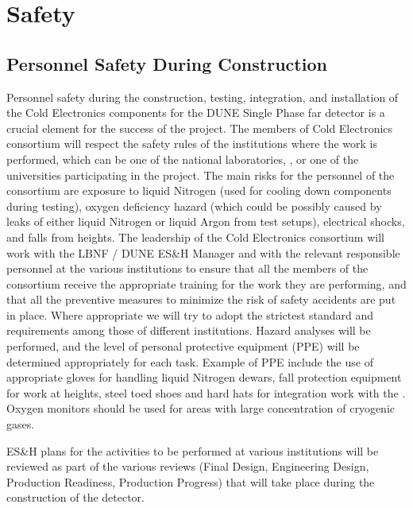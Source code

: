 \section{Safety}
\label{sec:fdsp-tpcelec-safety}

\subsection{Personnel Safety During Construction}
\label{sec:fdsp-tpcelec-safety-personnel}

Personnel safety during the construction, testing, integration,
and installation of the Cold Electronics components for the DUNE
Single Phase far detector is a crucial element for the success
of the project. The members of Cold Electronics consortium will
respect the safety rules of the institutions where the work is
performed, which can be one of the national laboratories, \surf,
or one of the universities participating in the project.  The
main risks for the personnel of the consortium are exposure to
liquid Nitrogen (used for cooling down components during testing),
oxygen deficiency hazard (which could be possibly caused by leaks
of either liquid Nitrogen or liquid Argon from test setups),
electrical shocks, and falls from heights. The leadership of the
Cold Electronics consortium will work with the LBNF / DUNE
ES\&H Manager and with the relevant responsible personnel at the
various institutions to ensure that all the members of the
consortium receive the appropriate training for the work they
are performing, and that all the preventive measures to minimize
the risk of safety accidents are put in place. Where appropriate
we will try to adopt the strictest standard and requirements among
those of different institutions. Hazard analyses will be performed,
and the level of personal protective equipment (PPE) will be determined
appropriately for each task. Example of PPE include the use of
appropriate gloves for handling liquid Nitrogen dewars, fall
protection equipment for work at heights, steel toed shoes and
hard hats for integration work with the . Oxygen
monitors should be used for areas with large concentration of
cryogenic gases.

ES\&H plans for the activities to be performed at various institutions
will be  reviewed as part of the various reviews (Final Design,
Engineering Design, Production Readiness, Production Progress)
that will take place during the construction of the detector.

